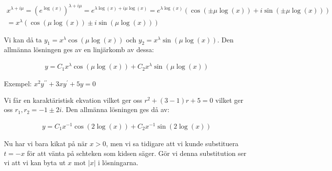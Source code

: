 \begin{equation*}
  \begin{gathered}
    x^{\lambda+i\mu} = \left(e^{\log(x)}\right)^{\lambda+i\mu} = e^{\lambda\log(x)+i\mu\log(x)} = e^{\lambda\log(x)}(\cos(\pm\mu\log(x))+i\sin(\pm\mu\log(x)))\\
    = x^{\lambda}(\cos(\mu\log(x))\pm i\sin(\mu\log(x)))
  \end{gathered}
\end{equation*}\par
\noindent Vi kan då ta $y_1 = x^{\lambda}\cos(\mu\log(x))$ och $y_2 = x^{\lambda}\sin(\mu\log(x))$. Den allmänna lösningen ges av en linjärkomb av dessa:

\begin{equation*}
  \begin{gathered}
    y = C_1x^{\lambda}\cos(\mu\log(x))+C_2x^{\lambda}\sin(\mu\log(x))
  \end{gathered}
\end{equation*}\par
\noindent Exempel: $x^2y^{\prime\prime}+3xy^{\prime}+5y=0$\par
\noindent Vi får en karaktäristisk ekvation vilket ger oss $r^2+(3-1)r+5=0$ vilket ger oss $r_1,r_2 = -1\pm2i$. Den allmänna lösningen ges då av:

\begin{equation*}
  \begin{gathered}
    y = C_1x^{-1}\cos(2\log(x))+C_2x^{-1}\sin(2\log(x))
  \end{gathered}
\end{equation*}
\par\bigskip
\noindent Nu har vi bara kikat på när $x>0$, men vi sa tidigare att vi kunde substituera $t = -x$ för att vänta på schteken som kidsen säger. Gör vi denna substitution ser vi att vi kan byta ut $x$ mot $\left|x\right|$ i lösningarna. 
\par\bigskip

